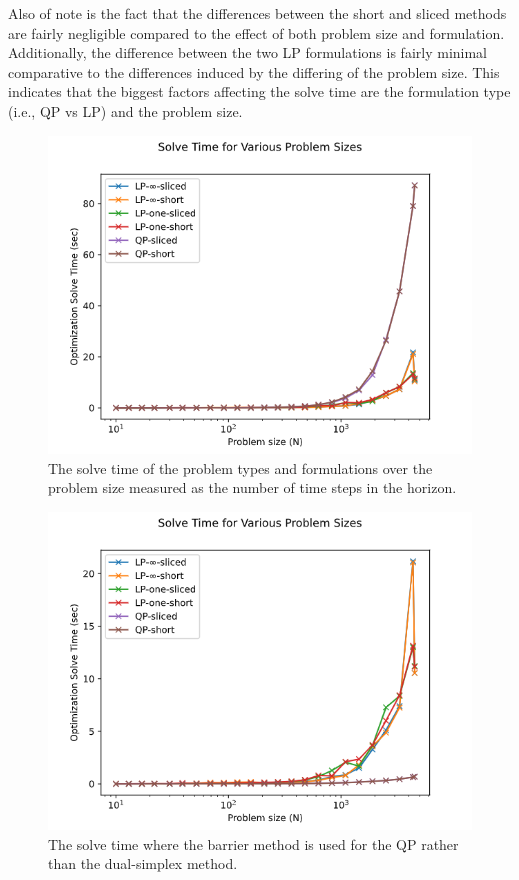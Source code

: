 Also of note is the fact that the differences between the short and sliced methods are fairly negligible compared to the effect of both problem size and formulation. Additionally, the difference between the two LP formulations is fairly minimal comparative to the differences induced by the differing of the problem size. This indicates that the biggest factors affecting the solve time are the formulation type (i.e., QP vs LP) and the problem size.

\begin{figure}
    \centering
    \includegraphics[width=\linewidth]{figs/solve_time.png}
    \caption{The solve time of the problem types and formulations over the problem size measured as the number of time steps in the horizon.}
    \label{fig:solve_time}
\end{figure}

\begin{figure}
    \centering
    \includegraphics[width=\linewidth]{figs/solve_time_barrier.png}
    \caption{The solve time where the barrier method is used for the QP rather than the dual-simplex method.}
    \label{fig:solve_time_barrier}
\end{figure}

